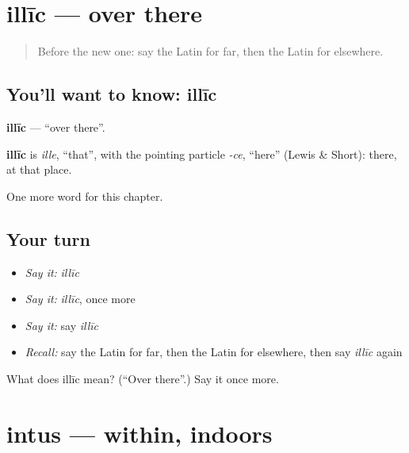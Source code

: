 \section[illīc]{illīc — over there}

\label{lesson:LA-C177-illic}



\begin{quote}
Before the new one: say the Latin for far, then the Latin for elsewhere.
\end{quote}

\subsection*{You'll want to know: illīc}
\textbf{illīc} — \textquotedblleft{}over there\textquotedblright{}.

\begin{cousinweb}
\textbf{illīc} is \emph{ille}, \textquotedblleft{}that\textquotedblright{}, with the pointing particle \emph{-ce}, \textquotedblleft{}here\textquotedblright{} (Lewis \& Short): there, at that place.
\end{cousinweb}

\begin{grammarlens}[title={What you've built}]
One more word for this chapter.
\end{grammarlens}

\subsection*{Your turn}
\begin{itemize}
\raggedright
  \item \emph{Say it:} \emph{illīc}
  \item \emph{Say it:} \emph{illīc}, once more
  \item \emph{Say it:} say \emph{illīc}
  \item \emph{Recall:} say the Latin for far, then the Latin for elsewhere, then say \emph{illīc} again
\end{itemize}

\begin{tcolorbox}[breakable,colback=teal!4,colframe=teal!35!black,title={Before you move on}]
What does illīc mean? (\textquotedblleft{}Over there\textquotedblright{}.) Say it once more.
\end{tcolorbox}
\section[intus]{intus — within, indoors}

